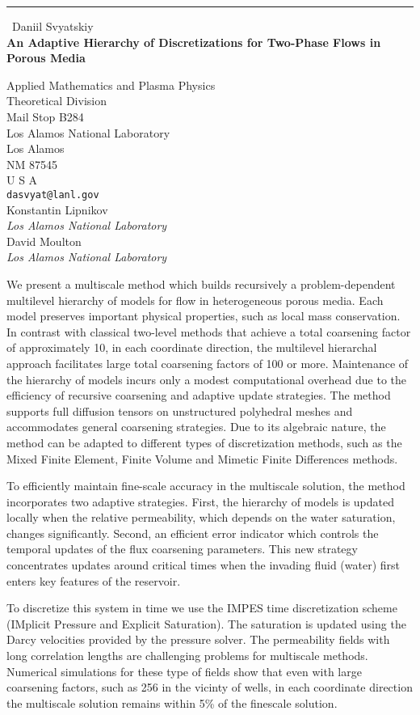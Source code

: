 \documentclass{report}
\begin{document}
\begin{center}
\rule{6in}{1pt} \
{\large Daniil Svyatskiy \\
{\bf An Adaptive Hierarchy of Discretizations for Two-Phase Flows in Porous Media}}

Applied Mathematics and Plasma Physics \\ Theoretical Division \\ Mail Stop B284 \\ Los Alamos National Laboratory \\ Los Alamos \\ NM 87545 \\ U S A
\\
{\tt dasvyat@lanl.gov}\\
Konstantin Lipnikov\\
{\em Los Alamos National Laboratory}\\
David Moulton\\
{\em Los Alamos National Laboratory}\end{center}

We present a multiscale method which builds recursively a
problem-dependent multilevel hierarchy of models for flow in
heterogeneous porous media. Each model preserves important physical
properties, such as local mass conservation. In contrast with classical
two-level methods that achieve a total coarsening factor of approximately
10, in each coordinate direction, the multilevel hierarchal approach
facilitates large total coarsening factors of 100 or more.
Maintenance of the hierarchy of models incurs only a modest
computational overhead due to the efficiency of recursive
coarsening and adaptive update strategies. The method supports full
diffusion tensors on unstructured polyhedral meshes and accommodates
general coarsening strategies. Due to its algebraic nature, the method
can be adapted to different types of discretization methods, such as the
Mixed Finite
Element, Finite Volume and Mimetic Finite Differences methods.


To efficiently maintain fine-scale accuracy in the multiscale
solution, the method incorporates two adaptive
strategies. First, the hierarchy of models is updated locally when
the relative permeability, which depends on the water saturation,
changes significantly. Second, an efficient error indicator which
controls the temporal updates of the flux coarsening parameters. This new
strategy concentrates updates around critical times when the invading
fluid (water) first enters key features of the reservoir.

To discretize this system in time we use the IMPES time discretization
scheme (IMplicit Pressure and Explicit Saturation). The saturation is
updated using the Darcy velocities provided by the pressure solver. The
permeability fields with long correlation lengths are challenging
problems for multiscale methods. Numerical simulations for these type of
fields show that even with large coarsening factors, such as 256 in the
vicinty of wells, in each coordinate direction the multiscale solution
remains within 5\% of the finescale solution.
\end{document}
